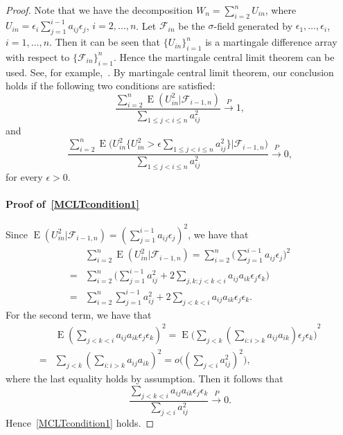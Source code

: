 \documentclass[smallcondensed,final,natbib]{svjour3}          %
\DeclareMathOperator{\myE}{E}
\begin{document}
 \begin{proof}
     Note that we have the decomposition $W_n=\sum_{i=2}^n U_{in}$, where $U_{in} =\epsilon_i \sum_{j=1}^{i-1} a_{ij}\epsilon_j$, $i=2,\ldots,n$.
    Let $\mathcal{F}_{in}$ be the $\sigma$-field generated by $\epsilon_1,\ldots,\epsilon_i$, $i=1,\ldots, n$.
     Then it can be seen that $\{U_{in}\}_{i=1}^n$
       is a martingale difference array with respect to $\{\mathcal{F}_{in}\}_{i=1}^n$. 
     Hence the martingale central limit theorem can be used. See, for example,~\citet[Theorem 1 of Chapter VIII ]{pollard1984convergence}.
     By martingale central limit theorem, our conclusion holds if the following two conditions are satisfied:
     \begin{equation}\label{MCLTcondition1}
         \frac{\sum_{i=2}^n \myE(U_{in}^2 |\mathcal{F}_{i-1,n})}{\sum_{1\leq j<i\leq n} a_{ij}^2}\xrightarrow{P} 1,
     \end{equation}
     and
     \begin{equation}\label{MCLTcondition2}
         \frac{\sum_{i=2}^n \myE\big(U_{in}^2\big\{U_{in}^2>\epsilon \sum_{1\leq j<i\leq n} a_{ij}^2\big\}\big|\mathcal{F}_{i-1,n}\big)}{\sum_{1\leq j<i\leq n} a_{ij}^2}\xrightarrow{P} 0,
     \end{equation}
     for every $\epsilon>0$.

     \paragraph{Proof of~\eqref{MCLTcondition1}}
     Since $\myE(U_{in}^2 |\mathcal{F}_{i-1,n})={(\sum_{j=1}^{i-1}a_{ij}\epsilon_j)}^2$, we have that
     \begin{equation*}
         \begin{aligned}
             &\sum_{i=2}^n \myE(U_{in}^2 |\mathcal{F}_{i-1,n})
             =\sum_{i=2}^n \big(\sum_{j=1}^{i-1}a_{ij}\epsilon_j \big)^2\\
             =&\sum_{i=2}^n \big( \sum_{j=1}^{i-1} a_{ij}^2 +2\sum_{j,k:j<k<i} a_{ij}a_{ik}\epsilon_j \epsilon_k \big)\\
             =&\sum_{i=2}^n  \sum_{j=1}^{i-1} a_{ij}^2 +2\sum_{j<k<i} a_{ij}a_{ik}\epsilon_j \epsilon_k.
         \end{aligned}
     \end{equation*}
     For the second term, we have that
     \begin{equation*}
         \begin{aligned}
             &\myE{(\sum_{j<k<i} a_{ij}a_{ik}\epsilon_j \epsilon_k)}^2
             =
             \myE{\big(\sum_{j<k} (\sum_{i:i>k}a_{ij}a_{ik})\epsilon_j \epsilon_k \big)}^2\\
             =&
             \sum_{j<k} (\sum_{i:i>k}a_{ij}a_{ik})^2
             =
             o\big({(\sum_{j<i} a_{ij}^2)}^2\big),
         \end{aligned}
     \end{equation*}
     where the last equality holds by assumption.
     Then it follows that
     \begin{equation*}
         \frac{\sum_{j<k<i} a_{ij}a_{ik}\epsilon_j \epsilon_k}{\sum_{j<i} a_{ij}^2}\xrightarrow{P} 0.
     \end{equation*}
     Hence~\eqref{MCLTcondition1} holds.

\end{proof}
\end{document}
